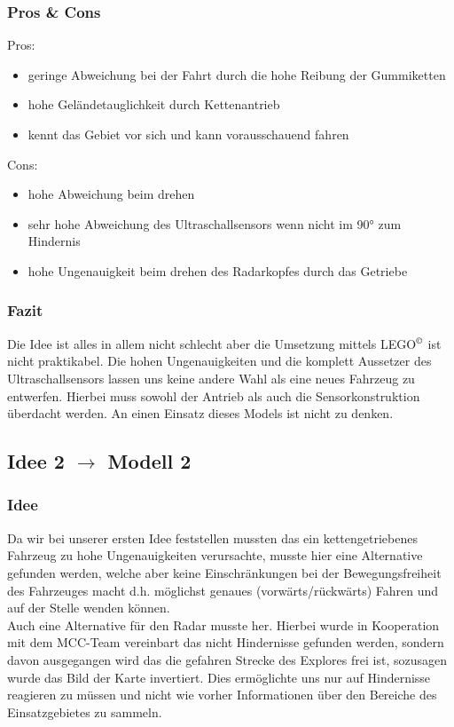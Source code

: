 \documentclass[10pt,a4paper]{scrartcl}
\begin{document}
\subsubsection{Pros \& Cons}
Pros:
\begin{itemize}
\item geringe Abweichung bei der Fahrt durch die hohe Reibung der Gummiketten
\item hohe Geländetauglichkeit durch Kettenantrieb
\item kennt das Gebiet vor sich und kann vorausschauend fahren
\end{itemize}
Cons:
\begin{itemize}
\item hohe Abweichung beim drehen
\item sehr hohe Abweichung des Ultraschallsensors wenn nicht im 90° zum Hindernis
\item hohe Ungenauigkeit beim drehen des Radarkopfes durch das Getriebe
\end{itemize}
\subsubsection{Fazit}
Die Idee ist alles in allem nicht schlecht aber die Umsetzung mittels LEGO$^\copyright$ ist nicht praktikabel. Die hohen Ungenauigkeiten und die komplett Aussetzer des Ultraschallsensors lassen uns keine andere Wahl als eine neues Fahrzeug zu entwerfen. Hierbei muss sowohl der Antrieb als auch die Sensorkonstruktion überdacht werden. An einen Einsatz dieses Models ist nicht zu denken.
\subsection{Idee 2 $\rightarrow$ Modell 2}%
\subsubsection{Idee}
Da wir bei unserer ersten Idee feststellen mussten das ein kettengetriebenes Fahrzeug zu hohe Ungenauigkeiten verursachte, musste hier eine Alternative gefunden werden, welche aber keine Einschränkungen bei der Bewegungsfreiheit des Fahrzeuges macht d.h. möglichst genaues (vorwärts/rückwärts) Fahren und auf der Stelle wenden können.\\
Auch eine Alternative für den Radar musste her. Hierbei wurde in Kooperation mit dem MCC-Team vereinbart das nicht Hindernisse gefunden werden, sondern davon ausgegangen wird das die gefahren Strecke des Explores frei ist, sozusagen wurde das Bild der Karte invertiert. Dies ermöglichte uns nur auf Hindernisse reagieren zu müssen und nicht wie vorher Informationen über den Bereiche des Einsatzgebietes zu sammeln.
\end{document}
